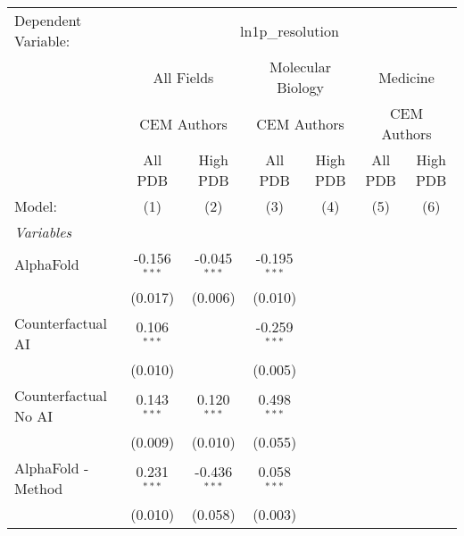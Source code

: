 \begingroup
\centering
\begin{tabular}{lcccccc}
   \tabularnewline \midrule \midrule
   Dependent Variable: & \multicolumn{6}{c}{ln1p\_resolution}\\
 & \multicolumn{2}{c}{All Fields} & \multicolumn{2}{c}{Molecular Biology} & \multicolumn{2}{c}{Medicine} \\
\cmidrule(lr){2-3} \cmidrule(lr){4-5} \cmidrule(lr){6-7}
 & \multicolumn{2}{c}{CEM Authors} & \multicolumn{2}{c}{CEM Authors} & \multicolumn{2}{c}{CEM Authors} \\
\cmidrule(lr){2-3} \cmidrule(lr){4-5} \cmidrule(lr){6-7}
 & \multicolumn{1}{c}{All PDB} & \multicolumn{1}{c}{High PDB} & \multicolumn{1}{c}{All PDB} & \multicolumn{1}{c}{High PDB} & \multicolumn{1}{c}{All PDB} & \multicolumn{1}{c}{High PDB} \\
\cmidrule(lr){2-2} \cmidrule(lr){3-3} \cmidrule(lr){4-4} \cmidrule(lr){5-5} \cmidrule(lr){6-6} \cmidrule(lr){7-7}
   Model:                                                     & (1)            & (2)            & (3)            & (4) & (5) & (6)\\  
   \midrule
   \emph{Variables}\\
   AlphaFold                                                  & -0.156$^{***}$ & -0.045$^{***}$ & -0.195$^{***}$ &     &     &   \\   
                                                              & (0.017)        & (0.006)        & (0.010)        &     &     &   \\   
   Counterfactual AI                                          & 0.106$^{***}$  &                & -0.259$^{***}$ &     &     &   \\   
                                                              & (0.010)        &                & (0.005)        &     &     &   \\   
   Counterfactual No AI                                       & 0.143$^{***}$  & 0.120$^{***}$  & 0.498$^{***}$  &     &     &   \\   
                                                              & (0.009)        & (0.010)        & (0.055)        &     &     &   \\   
   AlphaFold - Method                                         & 0.231$^{***}$  & -0.436$^{***}$ & 0.058$^{***}$  &     &     &   \\   
                                                              & (0.010)        & (0.058)        & (0.003)        &     &     &   \\   

\end{tabular}
